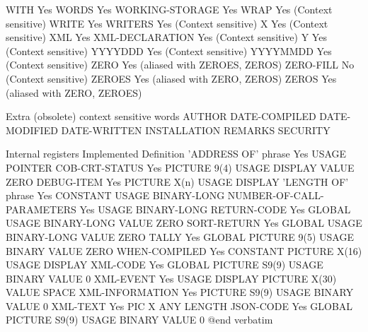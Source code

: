 WITH                            Yes
WORDS                           Yes
WORKING-STORAGE                 Yes
WRAP                            Yes (Context sensitive)
WRITE                           Yes
WRITERS                         Yes (Context sensitive)
X                               Yes (Context sensitive)
XML                             Yes
XML-DECLARATION                 Yes (Context sensitive)
Y                               Yes (Context sensitive)
YYYYDDD                         Yes (Context sensitive)
YYYYMMDD                        Yes (Context sensitive)
ZERO                            Yes (aliased with ZEROES, ZEROS)
ZERO-FILL                       No (Context sensitive)
ZEROES                          Yes (aliased with ZERO, ZEROS)
ZEROS                           Yes (aliased with ZERO, ZEROES)

Extra (obsolete) context sensitive words
AUTHOR
DATE-COMPILED
DATE-MODIFIED
DATE-WRITTEN
INSTALLATION
REMARKS
SECURITY

Internal registers              Implemented     Definition
'ADDRESS OF' phrase             Yes             USAGE POINTER
COB-CRT-STATUS                  Yes             PICTURE 9(4) USAGE DISPLAY VALUE ZERO
DEBUG-ITEM                      Yes             PICTURE X(n) USAGE DISPLAY
'LENGTH OF' phrase              Yes             CONSTANT USAGE BINARY-LONG
NUMBER-OF-CALL-PARAMETERS       Yes             USAGE BINARY-LONG
RETURN-CODE                     Yes             GLOBAL USAGE BINARY-LONG VALUE ZERO
SORT-RETURN                     Yes             GLOBAL USAGE BINARY-LONG VALUE ZERO
TALLY                           Yes             GLOBAL PICTURE 9(5) USAGE BINARY VALUE ZERO
WHEN-COMPILED                   Yes             CONSTANT PICTURE X(16) USAGE DISPLAY
XML-CODE                        Yes             GLOBAL PICTURE S9(9) USAGE BINARY VALUE 0
XML-EVENT                       Yes             USAGE DISPLAY PICTURE X(30) VALUE SPACE
XML-INFORMATION                 Yes             PICTURE S9(9) USAGE BINARY VALUE 0
XML-TEXT                        Yes             PIC X ANY LENGTH
JSON-CODE                       Yes             GLOBAL PICTURE S9(9) USAGE BINARY VALUE 0
@end verbatim
